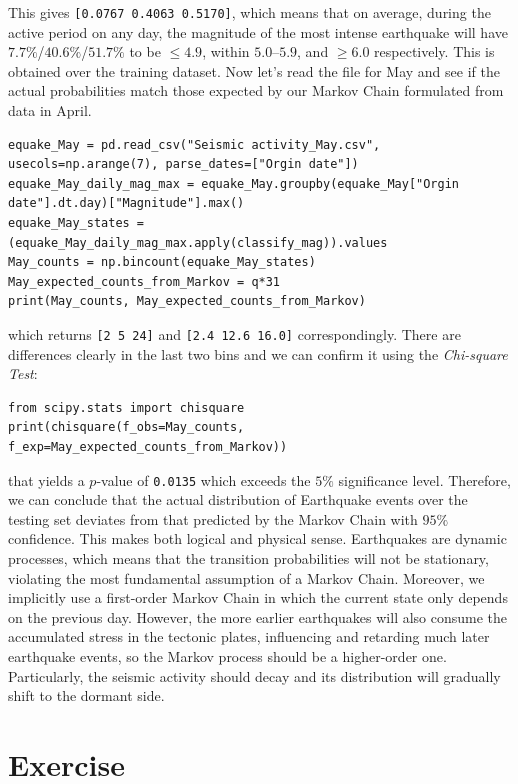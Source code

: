 This gives \verb|[0.0767 0.4063 0.5170]|, which means that on average, during the active period on any day, the magnitude of the most intense earthquake will have $7.7\%$/$40.6\%$/$51.7\%$ to be $\leq 4.9$, within $5.0$--$5.9$, and $\geq 6.0$ respectively. This is obtained over the training dataset. Now let's read the file for May and see if the actual probabilities match those expected by our Markov Chain formulated from data in April.
\begin{lstlisting}
equake_May = pd.read_csv("Seismic activity_May.csv", usecols=np.arange(7), parse_dates=["Orgin date"])
equake_May_daily_mag_max = equake_May.groupby(equake_May["Orgin date"].dt.day)["Magnitude"].max()
equake_May_states = (equake_May_daily_mag_max.apply(classify_mag)).values
May_counts = np.bincount(equake_May_states)
May_expected_counts_from_Markov = q*31
print(May_counts, May_expected_counts_from_Markov)
\end{lstlisting}
which returns \verb|[2 5 24]| and \verb|[2.4 12.6 16.0]| correspondingly. There are differences clearly in the last two bins and we can confirm it using the \textit{Chi-square Test}:
\begin{lstlisting}
from scipy.stats import chisquare
print(chisquare(f_obs=May_counts, f_exp=May_expected_counts_from_Markov))  
\end{lstlisting}
that yields a $p$-value of \verb|0.0135| which exceeds the $5\%$ significance level. Therefore, we can conclude that the actual distribution of Earthquake events over the testing set deviates from that predicted by the Markov Chain with $95\%$ confidence. This makes both logical and physical sense. Earthquakes are dynamic processes, which means that the transition probabilities will not be stationary, violating the most fundamental assumption of a Markov Chain. Moreover, we implicitly use a first-order Markov Chain in which the current state only depends on the previous day. However, the more earlier earthquakes will also consume the accumulated stress in the tectonic plates, influencing and retarding much later earthquake events, so the Markov process should be a higher-order one. Particularly, the seismic activity should decay and its distribution will gradually shift to the dormant side.

\section{Exercise}

